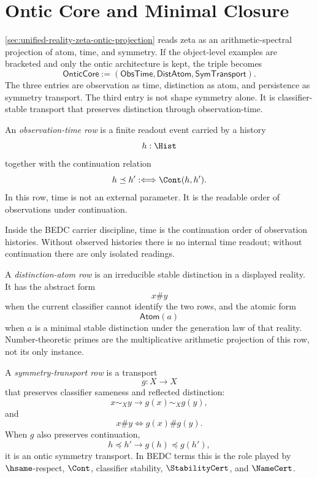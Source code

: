 \section{Ontic Core and Minimal Closure}
\label{sec:unified-reality-ontic-core-minimal-closure}

\autoref{sec:unified-reality-zeta-ontic-projection} reads zeta as an
arithmetic-spectral projection of atom, time, and symmetry. If the
object-level examples are bracketed and only the ontic architecture is
kept, the triple becomes
$$
\mathsf{OnticCore}
:=
(\mathsf{ObsTime},\mathsf{DistAtom},\mathsf{SymTransport}).
$$
The three entries are observation as time, distinction as atom, and
persistence as symmetry transport. The third entry is not shape
symmetry alone. It is classifier-stable transport that preserves
distinction through observation-time.

\begin{definition}
\label{def:unified-reality-observation-time-row}
An \emph{observation-time row} is a finite readout event carried by a
history
$$
h:\Hist
$$
together with the continuation relation
$$
h\preceq h'
:\Longleftrightarrow
\Cont(h,h').
$$
In this row, time is not an external parameter. It is the readable order
of observations under continuation.
\end{definition}

\begin{principle}
\label{prin:unified-reality-time-observable-continuation}
Inside the BEDC carrier discipline, time is the continuation order of
observation histories. Without observed histories there is no internal
time readout; without continuation there are only isolated readings.
\end{principle}

\begin{definition}
\label{def:unified-reality-distinction-atom-row}
A \emph{distinction-atom row} is an irreducible stable distinction in a
displayed reality. It has the abstract form
$$
x\# y
$$
when the current classifier cannot identify the two rows, and the
atomic form
$$
\mathsf{Atom}(a)
$$
when $a$ is a minimal stable distinction under the generation law of
that reality. Number-theoretic primes are the multiplicative arithmetic
projection of this row, not its only instance.
\end{definition}

\begin{definition}
\label{def:unified-reality-symmetry-transport-row}
A \emph{symmetry-transport row} is a transport
$$
g:X\to X
$$
that preserves classifier sameness and reflected distinction:
$$
x\sim_X y
\to
g(x)\sim_X g(y),
$$
and
$$
x\# y
\Longleftrightarrow
g(x)\# g(y).
$$
When $g$ also preserves continuation,
$$
h\preceq h'
\to
g(h)\preceq g(h'),
$$
it is an ontic symmetry transport. In BEDC terms this is the role played
by $\hsame$-respect, $\Cont$, classifier stability, $\StabilityCert$,
and $\NameCert$.
\end{definition}

